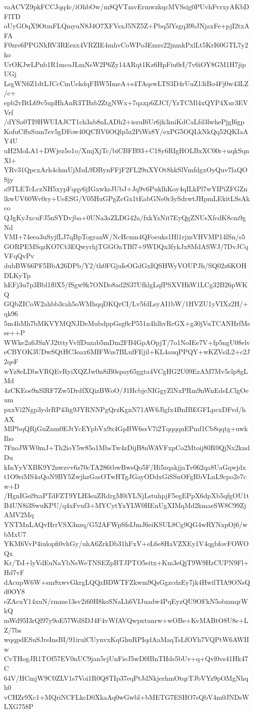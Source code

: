 vaACVZ9pkFCCJqq4c/iOhbOw/m8QVTmvErmwzkqcMVSsig0PUvhFvrxyAKbDFlTD
oUyGOqX9OtmFLQmyuN8J4O7XFVsxJ5NZ5Z+Pbq5lYsgq39bJNjaxFe+pjI2txAFA
F0zre6PPGNkRV3REezx4VRZIE4mhvCoWPo3Emrs22jnmkPxlLt5KrI60GTL7y2ko
UrOKJwLPnb1R1mcoJLmNsW2P6Zy14ARqt1Kz6HpFiu0rI/7v6iOY8GM1H7jipUGj
LsgWN6Z1dtLJCcCmUekdqFBW5ImeA+s4TAqswLTS3D4rUuZ13iBo4Fj0w43LZ/c+
epb2vBtL69v5upHhAnR3TBzb2ZtgNWx+7qaxp6ZJCf/YzTCMl4xQYP4Xur3EVVrf
/dYSa0TI9HWUIAJCT1ch3ab8nLADh2+iszuI6Ur6jk3miKdCaLfd3lwhePjgI6gp
KofuCffuSum7ev5gDFow40QCBV6OQlp5z2PiWz8Y/exPG5OQLkNkQq52QKIaAY4U
uH2MoLA1+DWjez5o1o/XmjXjTc/biCBFB93+C18y6RIgHOLBxXC00r+uqkSqnXl+
YRv31QpcxArh4chmUjMuL9DBynFFjF2FL29uXYOt8hkSlVmfdgxOyQuv7laQOSjy
a9TLETcLczNH5xypFqqy6jIGxwksJUbJ+Jq9v6PuklhKoy4qILkPl7wYIPiZFGZn
lkwUV60Wv0ry+UeESG/V05HuGPgZcGx1tEabGNe0r3ySdrwtJHpmLEkitLSsAkco
QJgKyJxcuFJ5nSYDvjba+0UNa3aZLDG42a/fxkYzNit7EyQgZNUsXfcdK8cm9gNd
VMI+74eea3uSyjfLJ7qBpTogranW/NcHcmn4QFoeuks1Hl1rjxsVHVMP14lSn/s5
GORPEMSqzKO7Ct3EQwyrhjTGGOaTBf7+9WDQx3fykJx8MdASWJ/7DvJCqVFqQvPv
dubBW66PF5BbA26DPb/Y2/th0FGjuIeOGdGxIQSHWyVOUPJh/SQ02z6KOHDLKyTp
hEFj3u7p3Bbl1f0X5/fSgw9k7ONDo8ad2S37UfklgLqfPSXVHkW1LCg32B26pWKQ
GQbZICoW2ahbb3rah5oWMhqqDKQrCI/Lv5fdLsyAI1bW/1HVZU1yVIXz2H/+qk96
5m4hMh7bMKVYMQNJDeMubdppGsg0cP551n4hlhvRcGX+g30jVuTCANHrfMsse++P
WWke2a6JSnVJ2tttyVvlfDuzab5mDm2FB4GpAOpjT/7o1NoIEe7V+fp5ngU08elv
eCBYOK3UDwSQtHC3oax6MIFWzs7BLufFEjil+KL4auqPPQY+wKZVsiL2+c2J2qeF
wYz8eLDbsVRQEvRyiXQZJw0n8iB0spay65ggta4VCgHG2U09EzAM7Mv5clp8gLMd
4zCKEoe9nSlRF7Zw5DrdfXQizBWoO/J1HcbjeNIGgyZlNxPRm9nWnEdeLClgOeum
pxxVi2Ngp3ydrRP43ig9JYRNNPgQrzKgnN71AW6Jlgfx4BnIBEGFLpcxDFvd/hAX
MlPbqQRjGuZnm0EJtYcEYpbVx9x4GpBW6ssV7i2TqqqqnEPmf1Cb8qqtg+uwkIho
7FnoJWW0mJ+Th2ioY5w85o1MbsTw4zDijB8nWAVFxpCo2Mtoij80R0QjNx2kndDu
kInYyVXBK9Y2nwzvv6z70cTA286tbwBwsQo5F/Hi5zqakjjaTv062qa8UaGqwjdx
t1O9eiMS4aQoN9BY5ZwjhzGasOTwHTgJGayODdxGiSSnOFgRbVLnL9cpo2e7cw+D
/HgnIGsi9xaPTdFZT9YLH3suZRdrgM0iYLNjLstuhpjF5egEPpX6dpXb5qfgOU1t
B4UN8i3SwuKPU/q4xFvuf3+MYCytYxYLW0HEnUgXIMqMd2kmaeSW8C99ZjAMV2Mq
YNTMnLAQvHrrVSX3nzq/G52AFWpSfsIJmJ6eiKSUL8Cg9QG4wRYNxpOj6/wbMxU7
YKM6VvP4iulopfi0vhGy/uhA6ZrkDb31hFxV+eL6e8HaVZXEy1V4qgbfovFOWOQx
Kr/TsI+lyVdEuNaYbNsWeTNSEZpBTJPTO5eitx+Km3eQjT9W9HzCUPN9Fl+Hd7vF
dAcupW6W+sm8xwvGkrgLQQzBDWTFZkwm9QsGgzcdzEy7jk4HwilTIA9ONsQd0OY8
eZAcuY14xuN/rmme13sv2i60H8koSNaLh6VIJuadw4PqEyzQU9OFkN5obxmqrWkQ
mWd95I3rQl97y9oE57WdSDJ4F4vWfAVQwpxtunrw+wOBe+KvMABtO8U8e+LZ/7bs
wqqpdESuSJreInsBI/91irulCUynvxKqGhuRPIqdAaMaqTsLfOYh7VQPtW6AWIIw
CvTHogJR1TOf57EV0nUC9jan5cjUnFieJ5wD0lBnTHds5bUv+q+Qvl0vs41Hk47C
64V/HCmjW9C0ZLV1s7Voi1R0Q8TIp37eqPtJdNkjerhmOtqrTJbVYz9pOMgNhqh0
vCHZr9Xc1+MQriNCFLkcD0XkaAq0wGwbl+bMETG7ESHO7sQbV4m0JNDsWLXG758P
